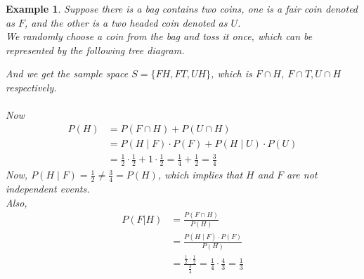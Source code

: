 \documentclass[11pt,oneside]{book}
\theoremstyle{newStyle}
\newtheorem{ex}{Example}[section]
\begin{document}
\begin{ex}
Suppose there is a bag contains two coins, one is a fair coin denoted as $F$, and the other is a two headed coin denoted as $U$. \\
We randomly choose a coin from the bag and toss it once, which can be represented by the following tree diagram.\\
\begin{center}
\end{center}
And we get the sample space $S=\{FH,FT,UH\}$, which is $F\cap H$, $F\cap T,U\cap H$ respectively.\\
\hfill\\
Now \begin{align*}
P(H)&=P(F\cap H)+P(U\cap H)\\
&=P(H\mid F)\cdot P(F)+P(H\mid U)\cdot P(U)\\
&=\frac{1}{2}\cdot \frac{1}{2}+1\cdot \frac{1}{2}=\frac{1}{4}+\frac{1}{2}=\frac{3}{4}
\end{align*}
Now, $P(H\mid F)=\frac{1}{2}\neq \frac{3}{4}=P(H)$, which implies that $H$ and $F$ are not independent events. \\
Also, \begin{align*}
P(F|H)&=\frac{P(F\cap H)}{P(H)}\\
&=\frac{P(H\mid F)\cdot P(F)}{P(H)}\\
&=\frac{\frac{1}{2}\cdot \frac{1}{2}}{\frac{3}{4}}=\frac{1}{4}\cdot \frac{4}{3}=\frac{1}{3}

\end{align*}
\end{ex}
\end{document}
